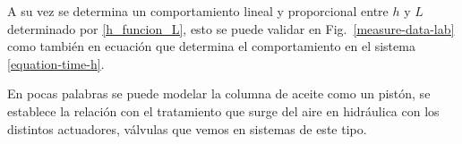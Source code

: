 A su vez se determina un comportamiento lineal y proporcional entre $h$ y $L$ determinado por \ref{h_funcion_L}, esto se puede validar en Fig.~\ref{measure-data-lab} como también en ecuación que determina el comportamiento en el sistema \ref{equation-time-h}.

En pocas palabras se puede modelar la columna de aceite como un pistón, se establece la relación con el tratamiento que surge del aire en hidráulica con los distintos actuadores, válvulas que vemos en sistemas de este tipo.





%





